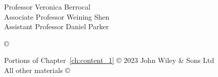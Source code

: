 




\othercommitteemembers
{
  Professor Veronica Berrocal\\
  Associate Professor Weining Shen\\
  Assistant Professor Daniel Parker
}


\copyrightdeclaration
{
  {\copyright} {\Degreeyear} \Authorname
}

\prepublishedcopyrightdeclaration
{
Portions of Chapter~\ref{ch:content_1} {\copyright} 2023 John Wiley \& Sons Ltd\\
All other materials {\copyright} {\Degreeyear} \Authorname
}

  

